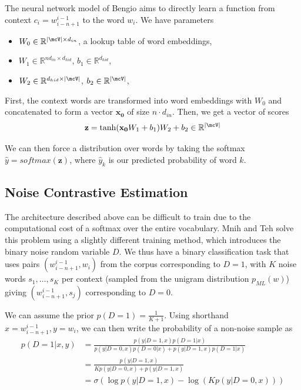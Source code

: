 \documentclass[11pt]{article}
\begin{document}
The neural network model of Bengio aims to directly learn a function from context $c_i = w_{i-n+1}^{i-1}$ to the word $w_i$. We have parameters
\begin{itemize}
\item $W_0 \in \mathbb{R}^{|\mcV| \times d_{in}}$, a lookup table of word embeddings,
\item $W_1 \in \mathbb{R}^{nd_{in} \times d_{hid}}$, $b_1 \in \mathbb{R}^{d_{hid}}$,
\item $W_2 \in \mathbb{R}^{d_{hid} \times |\mcV|}$, $b_2 \in \mathbb{R}^{|\mcV|}$,
\end{itemize}

First, the context words are transformed into word embeddings with $W_0$ and concatenated to form a vector $ \mathbf{x_0}$ of size $n \cdot  d_{in}$. Then, we get a vector of scores
$$\mathbf{z} = \tanh(\mathbf{x_0}W_1 + b_1)W_2 + b_2 \in \mathbb{R}^{|\mcV|}$$

We can then force a distribution over words by taking the softmax $\widehat{y} = softmax(\mathbf{z})$, where $\widehat{y}_k$ is our predicted probability of word $k$.

\subsection{Noise Contrastive Estimation}

The architecture described above can be difficult to train due to the computational cost of a softmax over the entire vocabulary. Mnih and Teh solve this problem using a slightly different training method, which introduces the binary noise random variable $D$. We thus have a binary classification task that uses pairs $(w_{i-n+1}^{i-1}, w_i)$ from the corpus corresponding to $D = 1$, with $K$ noise words $s_1, \ldots, s_K$ per context (sampled from the unigram distribution $p_{ML}(w)$) giving $(w_{i-n+1}^{i-1}, s_j)$ corresponding to $D = 0$.

We can assume the prior $p(D = 1) = \frac{1}{K+1}$. Using shorthand $x = w_{i-n+1}^{i-1}, y = w_i$, we can then write the probability of a non-noise sample as
\begin{align*}
p(D = 1 | x, y) & = \frac{p(y | D = 1, x)p(D = 1|x)}{p(y | D=0, x)p(D = 0|x) + p(y|D = 1, x)p(D = 1 | x)} \\
& = \frac{p(y | D = 1, x)}{Kp(y | D=0, x) + p(y|D = 1, x)} \\
& = \sigma(\log p(y | D = 1, x) - \log (Kp(y | D = 0, x)))
\end{align*}
\end{document}
